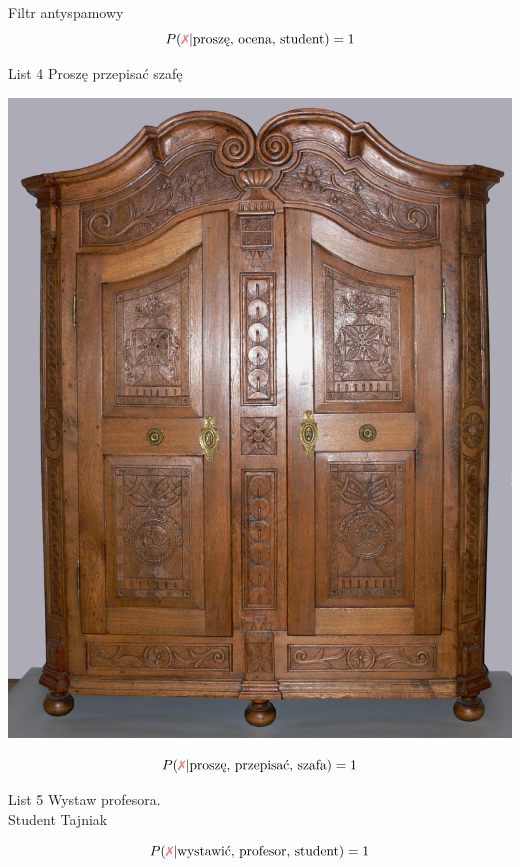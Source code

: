 \documentclass{beamer}
\newcommand{\xmark}{\textcolor{red!80!black!50}{\text{\ding{55}}}}
\begin{document}
\begin{frame}{Filtr antyspamowy}
{\[ P(\xmark | \text{proszę, ocena, student})=1 \]
}
{
	\begin{minipage}{.50\textwidth}
\begin{block}{List 4}
Proszę przepisać szafę
\end{block}
\end{minipage}
\hfill
\begin{minipage}{.45\textwidth}
\begin{centering}
\includegraphics[height=.4\textheight]{bayes/Eichenschrank_Oberschwaben.jpg}\\
\end{centering}
\end{minipage}
\[ P(\xmark | \text{proszę, przepisać, szafa})=1 \]
}
{
	\begin{minipage}{.50\textwidth}
\begin{block}{List 5}
Wystaw profesora.\\
Student Tajniak
\end{block}
\end{minipage}
\hfill
\begin{minipage}{.45\textwidth}
\begin{centering}
\def\svgwidth{.8\textwidth}

\end{centering}
\end{minipage}
\[ P(\xmark | \text{wystawić, profesor, student})=1 \]
}


\end{frame}
\end{document}
